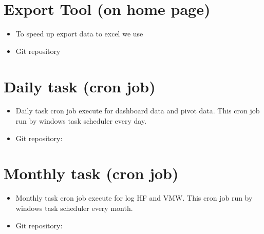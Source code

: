 \documentclass[letterpaper,10pt,english,openany,oneside]{sphinxmanual}
\let\sphinxpxdimen\pdfpxdimen\else\newdimen\sphinxpxdimen
\begin{document}
\section{Export Tool (on home page)}
\label{\detokenize{Third Party/data-export-tool:export-tool-on-home-page}}
\noindent{\hspace*{\fill}\sphinxincludegraphics[width=368\sphinxpxdimen]{{export-tool}.PNG}\hspace*{\fill}}
\begin{itemize}
\item {} 
\sphinxAtStartPar
To speed up export data to excel we use 

\item {} 
\sphinxAtStartPar
Git repository 

\end{itemize}


\section{Daily task (cron job)}
\label{\detokenize{Third Party/data-export-tool:daily-task-cron-job}}\begin{itemize}
\item {} 
\sphinxAtStartPar
Daily task cron job execute  for dashboard data and pivot data. This cron job run by windows task scheduler every day.

\item {} 
\sphinxAtStartPar
Git repository: 

\end{itemize}


\section{Monthly task (cron job)}
\label{\detokenize{Third Party/data-export-tool:monthly-task-cron-job}}\begin{itemize}
\item {} 
\sphinxAtStartPar
Monthly task cron job execute  for log HF and VMW. This cron job run by windows task scheduler every month.

\item {} 
\sphinxAtStartPar
Git repository: 

\end{itemize}
\end{document}
